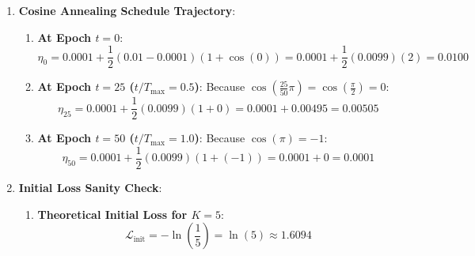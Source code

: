 \begin{enumerate}
\begin{enumerate}[label=(\alph*)]
        \item \textbf{BatchNorm Folding Calculations}:
        Given $W = 3.0, b = -2.0, \mu_{\text{run}} = 6.0, \sigma_{\text{run}} = 4.0, \gamma = 2.0, \beta = 1.0$:
        \begin{align*}
        W' &= \frac{\gamma}{\sigma_{\text{run}}} W = \left( \frac{2.0}{4.0} \right) \cdot 3.0 = 0.5 \cdot 3.0 = \mathbf{1.5000} \\
        b' &= \beta + \frac{\gamma}{\sigma_{\text{run}}} (b - \mu_{\text{run}}) = 1.0 + \left( \frac{2.0}{4.0} \right) (-2.0 - 6.0) \\
        &= 1.0 + 0.5(-8.0) = 1.0 - 4.0 = \mathbf{-3.0000}
        \end{align*}
        The fused linear layer executes as $\mathbf{y} = 1.5000 \cdot x - 3.0000$, eliminating the runtime BatchNorm layer entirely!
    \end{enumerate}

    \item \textbf{Cosine Annealing Schedule Trajectory}:
    \begin{enumerate}[label=(\alph*)]
        \item \textbf{At Epoch $t = 0$}:
        \begin{equation*}
        \eta_0 = 0.0001 + \frac{1}{2}(0.01 - 0.0001)\left(1 + \cos(0)\right) = 0.0001 + \frac{1}{2}(0.0099)(2) = \mathbf{0.0100}
        \end{equation*}

        \item \textbf{At Epoch $t = 25$ ($t / T_{\max} = 0.5$)}:
        Because $\cos(\frac{25}{50}\pi) = \cos(\frac{\pi}{2}) = 0$:
        \begin{equation*}
        \eta_{25} = 0.0001 + \frac{1}{2}(0.0099)(1 + 0) = 0.0001 + 0.00495 = \mathbf{0.00505}
        \end{equation*}

        \item \textbf{At Epoch $t = 50$ ($t / T_{\max} = 1.0$)}:
        Because $\cos(\pi) = -1$:
        \begin{equation*}
        \eta_{50} = 0.0001 + \frac{1}{2}(0.0099)(1 + (-1)) = 0.0001 + 0 = \mathbf{0.0001}
        \end{equation*}
    \end{enumerate}

    \item \textbf{Initial Loss Sanity Check}:
    \begin{enumerate}[label=(\alph*)]
        \item \textbf{Theoretical Initial Loss for $K = 5$}:
        \begin{equation*}
        \mathcal{L}_{\text{init}} = -\ln\left(\frac{1}{5}\right) = \ln(5) \approx \mathbf{1.6094}
        \end{equation*}


\end{enumerate}
\end{enumerate}
